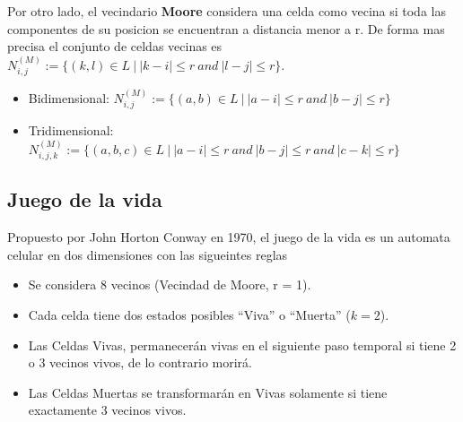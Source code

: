 Por otro lado, el vecindario \textbf{Moore} considera una celda como vecina si toda las componentes de su posicion se encuentran
a distancia menor a r. De forma mas precisa el conjunto de celdas vecinas es $N_{i,j}^{(M)}:=\{(k,l) \in L\ |\ |k-i|\leq r\ and\ |l - j| \leq r \}$.
\begin{itemize}
    \item Bidimensional: $N_{i,j}^{(M)}:=\{(a,b) \in L\ |\ |a-i|\leq r\ and\ |b - j| \leq r \}$
    \item Tridimensional: $N_{i,j,k}^{(M)}:=\{(a, b, c) \in L\ |\ |a-i|\leq r\ and\ |b - j|  \leq r\ and\ |c - k|  \leq r\}$
\end{itemize}


\subsection{Juego de la vida}\label{subsec:juego-de-la-vida}
Propuesto por John Horton Conway en 1970, el juego de la vida es un automata celular en dos dimensiones con las sigueintes reglas
\begin{itemize}
    \item Se considera 8 vecinos (Vecindad de Moore, r = 1).
    \item Cada celda tiene dos estados posibles “Viva” o “Muerta” ($k=2$).
    \item Las Celdas Vivas, permanecerán vivas en el siguiente paso temporal si tiene 2 o 3 vecinos vivos, de lo contrario morirá.
    \item Las Celdas Muertas se transformarán en Vivas solamente si tiene exactamente 3 vecinos vivos.
\end{itemize}
